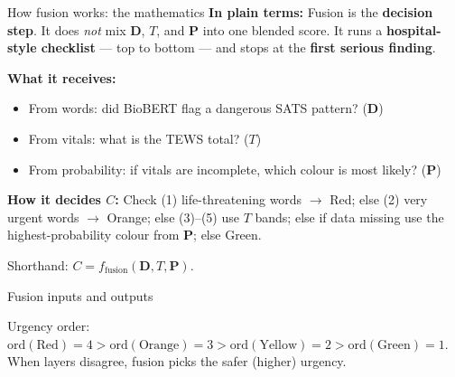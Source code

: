 \documentclass[aspectratio=169,11pt]{beamer}
\newcommand{\bcol}[2][blue!70!black]{\textcolor{#1}{#2}}
\begin{document}
\begin{frame}{How fusion works: the mathematics}
	\small
	\textbf{In plain terms:} Fusion is the \textbf{decision step}. It does \textit{not} mix $\mathbf{D}$, $T$, and $\mathbf{P}$ into one blended score. It runs a \textbf{hospital-style checklist} --- top to bottom --- and stops at the \textbf{first serious finding}.

	\vspace{0.25em}
	\textbf{What it receives:}
	\begin{itemize}
		\item From words: did BioBERT flag a dangerous SATS pattern? ($\mathbf{D}$)
		\item From vitals: what is the TEWS total? ($T$)
		\item From probability: if vitals are incomplete, which colour is most likely? ($\mathbf{P}$)
	\end{itemize}

	\vspace{0.2em}
	\textbf{How it decides $C$:} Check (1) life-threatening words $\rightarrow$ \bcol[triageRed]{Red}; else (2) very urgent words $\rightarrow$ \bcol[triageOrange]{Orange}; else (3)--(5) use $T$ bands; else if data missing use the highest-probability colour from $\mathbf{P}$; else \bcol[triageGreen]{Green}.

	\vspace{0.2em}
	\footnotesize
	Shorthand: $C = f_{\text{fusion}}(\mathbf{D}, T, \mathbf{P})$.
\end{frame}

\begin{frame}{Fusion inputs and outputs}
	\begin{center}
	\end{center}

	\vspace{0.15em}
	\footnotesize Urgency order: $\mathrm{ord}(\text{Red})=4 > \mathrm{ord}(\text{Orange})=3 > \mathrm{ord}(\text{Yellow})=2 > \mathrm{ord}(\text{Green})=1$. When layers disagree, fusion picks the safer (higher) urgency.
\end{frame}
\end{document}
